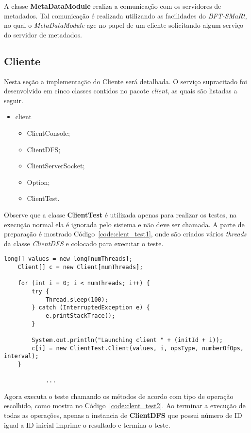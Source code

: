 A classe \textbf{MetaDataModule} realiza a comunicação com os servidores de metadados. Tal comunicação é realizada utilizando as facilidades do \textit{BFT-SMaRt}, no qual o \textit{MetaDataModule} age no papel de um cliente solicitando algum serviço do servidor de metadados.
\\

\subsection{Cliente}
Nesta seção a implementação do Cliente será detalhada. O serviço supracitado foi desenvolvido em cinco classes contidos no pacote \textit{client}, as quais são listadas a seguir.
\\

\begin{itemize}
	\item client
	\begin{itemize}
	\item ClientConsole;
	\item ClientDFS;
	\item ClientServerSocket;
	\item Option;
	\item ClientTest.
	\end{itemize}
\end{itemize}

Observe que a classe \textbf{ClientTest} é utilizada apenas para realizar os testes, na execução normal ela é ignorada pelo sistema e não deve ser chamada. A parte de preparação é mostrado Código~\ref{code:clent_test1}, onde são criados vários \textit{threads} da classe \textit{ClientDFS} e colocado para executar o teste.

\begin{lstlisting}[basicstyle=\ttfamily\footnotesize, frame=single, caption=Preparação de teste na classe ClientTest, label=code:clent_test1]		
	long[] values = new long[numThreads];
	Client[] c = new Client[numThreads];
	
	for (int i = 0; i < numThreads; i++) {
		try {
			Thread.sleep(100);
		} catch (InterruptedException e) {
			e.printStackTrace();
		}
	
		System.out.println("Launching client " + (initId + i));
		c[i] = new ClientTest.Client(values, i, opsType, numberOfOps, interval);
	}
		
			...
\end{lstlisting}

Agora executa o teste chamando os métodos de acordo com tipo de  operação escolhido, como mostra no Código~\ref{code:clent_test2}. 
Ao terminar a execução de todas as operações, apenas a instancia de \textbf{ClientDFS} que possui número de ID igual a ID inicial imprime o resultado e termina o teste.

